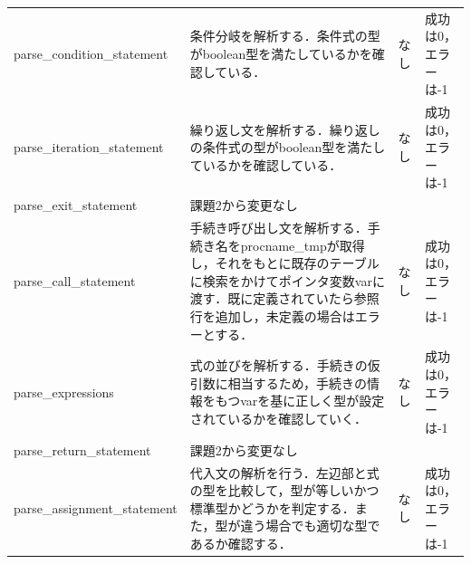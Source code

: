 \documentclass{jlreq}
\begin{document}
\begin{table}[H]
{\begin{tabular}{|l|p{15cm}|l|p{6cm}|}
      parse\_condition\_statement     & 条件分岐を解析する．条件式の型がboolean型を満たしているかを確認している．                                                                                                                                                                                      & なし & 成功は0，エラーは-1                \\
      parse\_iteration\_statement     & 繰り返し文を解析する．繰り返しの条件式の型がboolean型を満たしているかを確認している．                                                                                                                                                                          & なし & 成功は0，エラーは-1                \\
      parse\_exit\_statement          & 課題2から変更なし                                                                                                                                                                                                                                              & ~    & ~                                  \\
      parse\_call\_statement          & 手続き呼び出し文を解析する．手続き名をprocname\_tmpが取得し，それをもとに既存のテーブルに検索をかけてポインタ変数varに渡す．既に定義されていたら参照行を追加し，未定義の場合はエラーとする．                                                                   & なし & 成功は0，エラーは-1                \\
      parse\_expressions              & 式の並びを解析する．手続きの仮引数に相当するため，手続きの情報をもつvarを基に正しく型が設定されているかを確認していく．                                                                                                                                        & なし & 成功は0，エラーは-1                \\
      parse\_return\_statement        & 課題2から変更なし                                                                                                                                                                                                                                              & ~    & ~                                  \\
      parse\_assignment\_statement    & 代入文の解析を行う．左辺部と式の型を比較して，型が等しいかつ標準型かどうかを判定する．また，型が違う場合でも適切な型であるか確認する．                                                                                                                         & なし & 成功は0，エラーは-1                \\

\end{tabular}}
\end{table}
\end{document}

